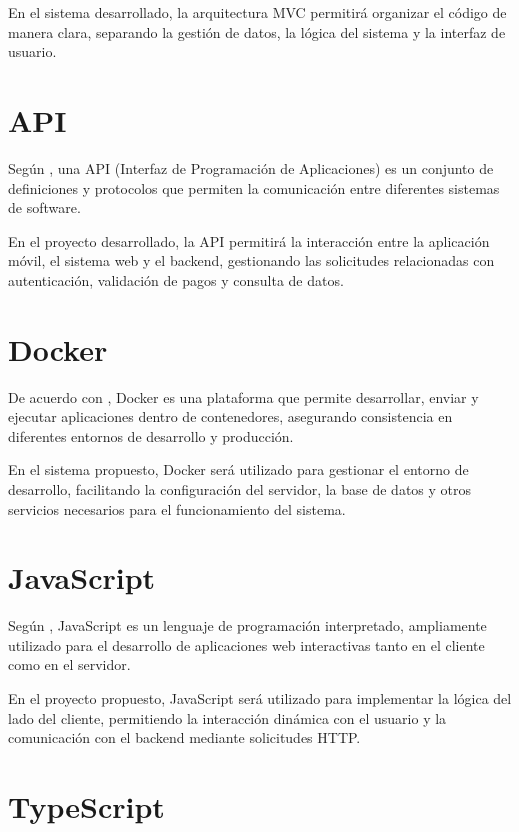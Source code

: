 \documentclass[12pt,letterpaper]{report}
\begin{document}
	En el sistema desarrollado, la arquitectura MVC permitirá organizar el código de manera clara, separando la gestión de datos, la lógica del sistema y la interfaz de usuario.
	
	\section{API}
	
	Según \citet{fielding2000}, una API (Interfaz de Programación de Aplicaciones) es un conjunto de definiciones y protocolos que permiten la comunicación entre diferentes sistemas de software.
	
	En el proyecto desarrollado, la API permitirá la interacción entre la aplicación móvil, el sistema web y el backend, gestionando las solicitudes relacionadas con autenticación, validación de pagos y consulta de datos.
	
	\section{Docker}
	
	De acuerdo con \citet{docker2023}, Docker es una plataforma que permite desarrollar, enviar y ejecutar aplicaciones dentro de contenedores, asegurando consistencia en diferentes entornos de desarrollo y producción.
	
	En el sistema propuesto, Docker será utilizado para gestionar el entorno de desarrollo, facilitando la configuración del servidor, la base de datos y otros servicios necesarios para el funcionamiento del sistema.
	
	\section{JavaScript}
	
	Según \citet{ecma262}, JavaScript es un lenguaje de programación interpretado, ampliamente utilizado para el desarrollo de aplicaciones web interactivas tanto en el cliente como en el servidor.
	
	En el proyecto propuesto, JavaScript será utilizado para implementar la lógica del lado del cliente, permitiendo la interacción dinámica con el usuario y la comunicación con el backend mediante solicitudes HTTP.
	
	\section{TypeScript}
	
\end{document}
